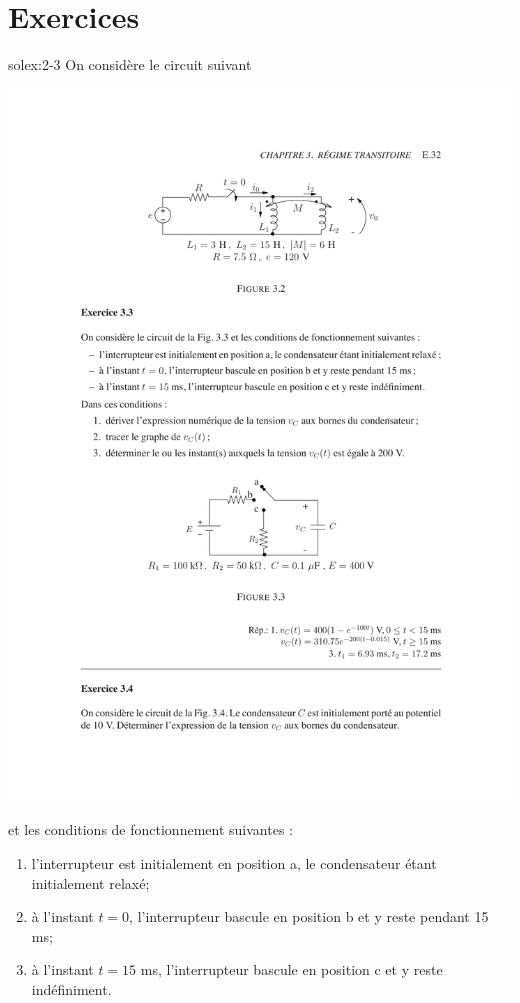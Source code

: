 
\section{Exercices}

\begin{exwithsol}{}{solex:2-3}
	\label{ex:2-3}
On consid\`ere le circuit suivant 
\begin{center}
	\includegraphics[width=0.85\linewidth]{exercices/ex-3-3}
\end{center}
et les conditions de fonctionnement suivantes :
\begin{enumerate}
	\item l'interrupteur est initialement en position a, le condensateur
	\'etant initialement relax\'e;
	\item \`a l'instant  $t=0$, l'interrupteur bascule en position b et y reste pendant 15 ms;
	\item \`a l'instant  $t=15$ ms, l'interrupteur bascule en position c et y reste ind\'efiniment. 

\end{enumerate}
\end{exwithsol}
